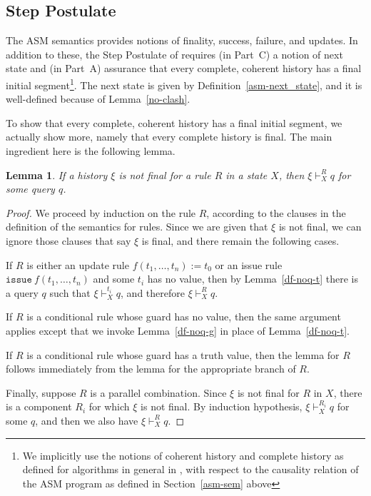 \documentclass{LMCS}
\newtheorem{la}[thm]{Lemma}
\theoremstyle{definition}
\newcommand{\ttt}[1]{\ensuremath{\mathtt {#1}}}
\begin{document}
\subsection{Step Postulate}

The ASM semantics provides notions of finality, success, failure, and
updates.  In addition to these, the Step Postulate of \cite{ga1}
requires (in Part~C) a notion of next state and (in Part~A) assurance
that every complete, coherent history has a final initial
segment\footnote{We implicitly use the notions of coherent history and
  complete history as defined for algorithms in general in
  \cite[Section~3]{ga1}, with respect to the causality relation of the
  ASM program as defined in Section~\ref{asm-sem} above}.  The next
state is given by Definition~\ref{asm-next_state}, and it is
well-defined because of Lemma~\ref{no-clash}.

To show that every complete, coherent history has a final initial
segment, we actually show more, namely that every complete history is
final.  The main ingredient here is the following lemma.

\begin{la}
  If a history $\xi$ is not final for a rule $R$ in a state $X$, then
  $\xi\vdash^R_Xq$ for some query $q$.
\end{la}

\begin{proof}
  We proceed by induction on the rule $R$, according to the clauses in
  the definition of the semantics for rules.  Since we are given that
  $\xi$ is not final, we can ignore those clauses that say $\xi$ is
  final, and there remain the following cases.

If $R$ is either an update rule $f(t_1,\dots,t_n):=t_0$ or an issue
rule $\ttt{issue}\ f(t_1,\dots,t_n)$ and some $t_i$ has no value, then
by Lemma~\ref{df-noq-t} there is a query $q$ such that
$\xi\vdash^{t_i}_Xq$, and therefore $\xi\vdash^R_Xq$.

If $R$ is a conditional rule whose guard has no value, then the same
argument applies except that we invoke Lemma~\ref{df-noq-g} in place
of Lemma~\ref{df-noq-t}.

If $R$ is a conditional rule whose guard has a truth value, then the
lemma for $R$ follows immediately from the lemma for the appropriate
branch of $R$.

Finally, suppose $R$ is a parallel combination.  Since $\xi$ is not
final for $R$ in $X$, there is a component $R_i$ for which $\xi$ is
not final.  By induction hypothesis, $\xi\vdash^{R_i}_Xq$ for some
$q$, and then we also have $\xi\vdash^R_Xq$.
\end{proof}
\end{document}
